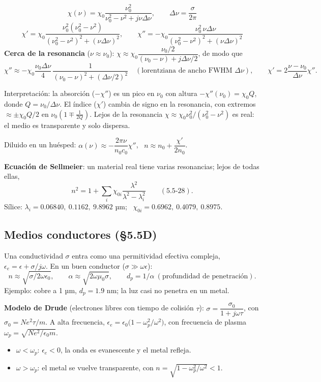 \documentclass[10pt]{article}
\begin{document}
\begin{clave}[title={Susceptibilidad de Lorentz (5.5-19)}]
\[
\chi(\nu)=\chi_0\frac{\nu_0^2}{\nu_0^2-\nu^2+j\nu\Delta\nu},\qquad \Delta\nu=\frac{\sigma}{2\pi}
\]
\[
\chi'=\chi_0\frac{\nu_0^2(\nu_0^2-\nu^2)}{(\nu_0^2-\nu^2)^2+(\nu\Delta\nu)^2},\qquad
\chi''=-\chi_0\frac{\nu_0^2\,\nu\Delta\nu}{(\nu_0^2-\nu^2)^2+(\nu\Delta\nu)^2}
\]
\textbf{Cerca de la resonancia} ($\nu\approx\nu_0$): $\chi\approx\chi_0\dfrac{\nu_0/2}{(\nu_0-\nu)+j\Delta\nu/2}$, de modo que
\[
\chi''\approx-\chi_0\frac{\nu_0\Delta\nu}{4}\,\frac{1}{(\nu_0-\nu)^2+(\Delta\nu/2)^2}\quad(\text{lorentziana de ancho FWHM }\Delta\nu),\qquad \chi'=2\frac{\nu-\nu_0}{\Delta\nu}\chi''.
\]
\end{clave}
Interpretación: la absorción ($-\chi''$) es un pico en $\nu_0$ con altura $-\chi''(\nu_0)=\chi_0Q$, donde $Q=\nu_0/\Delta\nu$. El índice ($\chi'$) cambia de signo en la resonancia, con extremos $\approx\pm\chi_0Q/2$ en $\nu_0(1\mp\frac1{2Q})$. Lejos de la resonancia $\chi\approx\chi_0\nu_0^2/(\nu_0^2-\nu^2)$ es real: el medio es transparente y solo dispersa.

Diluido en un huésped: $\alpha(\nu)\approx-\dfrac{2\pi\nu}{n_0c_0}\chi''$, \ $n\approx n_0+\dfrac{\chi'}{2n_0}$.

\textbf{Ecuación de Sellmeier}: un material real tiene varias resonancias; lejos de todas ellas,
\[
n^2=1+\sum_i\chi_{0i}\frac{\lambda^2}{\lambda^2-\lambda_i^2}\qquad(5.5\text{-}28).
\]
Sílice: $\lambda_i=0.06840,\ 0.1162,\ 9.8962$ µm; \ $\chi_{0i}=0.6962,\ 0.4079,\ 0.8975$.

\subsection{Medios conductores (§5.5D)}
Una conductividad $\sigma$ entra como una permitividad efectiva compleja, $\epsilon_e=\epsilon+\sigma/j\omega$. En un buen conductor ($\sigma\gg\omega\epsilon$):
\[
n\approx\sqrt{\sigma/2\omega\epsilon_0},\qquad \alpha\approx\sqrt{2\omega\mu_0\sigma},\qquad d_p=1/\alpha\ (\text{profundidad de penetración}).
\]
Ejemplo: cobre a 1 µm, $d_p=1.9$ nm; la luz casi no penetra en un metal.

\textbf{Modelo de Drude} (electrones libres con tiempo de colisión $\tau$): $\sigma=\dfrac{\sigma_0}{1+j\omega\tau}$, con $\sigma_0=Ne^2\tau/m$. A alta frecuencia, $\epsilon_e=\epsilon_0\big(1-\omega_p^2/\omega^2\big)$, con frecuencia de plasma $\omega_p=\sqrt{Ne^2/\epsilon_0m}$.
\begin{itemize}
\item $\omega<\omega_p$: $\epsilon_e<0$, la onda es evanescente y el metal refleja.
\item $\omega>\omega_p$: el metal se vuelve transparente, con $n=\sqrt{1-\omega_p^2/\omega^2}<1$.
\end{itemize}
\end{document}
